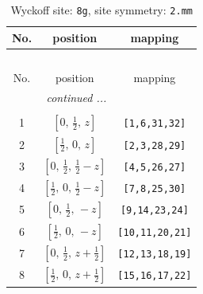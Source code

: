 \documentclass[fleqn,8pt]{jsarticle}
\begin{document}
\begin{longtable}{ccc}
\caption{Wyckoff site: {\tt 8g}, site symmetry: {\tt 2.mm}}
 \\
 \hline \hline
No. & position & mapping \\ \hline \endfirsthead

\multicolumn{2}{l}{\tablename\ \thetable{}} \\
 \hline \hline
No. & position & mapping \\ \hline \endhead

 \hline \hline
\multicolumn{2}{r}{\footnotesize\it continued ...} \\ \endfoot

 \hline \hline
\multicolumn{2}{r}{} \\ \endlastfoot

1 & $\left[ 0,\, \frac{1}{2},\, z \right]$ & {\tt [1,6,31,32]} \\ \hline
2 & $\left[ \frac{1}{2},\, 0,\, z \right]$ & {\tt [2,3,28,29]} \\ \hline
3 & $\left[ 0,\, \frac{1}{2},\, \frac{1}{2} - z \right]$ & {\tt [4,5,26,27]} \\ \hline
4 & $\left[ \frac{1}{2},\, 0,\, \frac{1}{2} - z \right]$ & {\tt [7,8,25,30]} \\ \hline
5 & $\left[ 0,\, \frac{1}{2},\, - z \right]$ & {\tt [9,14,23,24]} \\ \hline
6 & $\left[ \frac{1}{2},\, 0,\, - z \right]$ & {\tt [10,11,20,21]} \\ \hline
7 & $\left[ 0,\, \frac{1}{2},\, z + \frac{1}{2} \right]$ & {\tt [12,13,18,19]} \\ \hline
8 & $\left[ \frac{1}{2},\, 0,\, z + \frac{1}{2} \right]$ & {\tt [15,16,17,22]} \\
\end{longtable}
\renewcommand{\arraystretch}{1.2}
\end{document}
